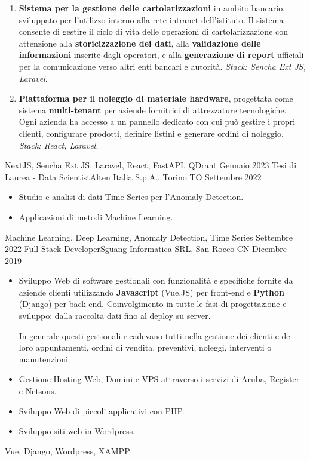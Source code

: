 \begin{experiences}
{\begin{itemize}
\begin{enumerate}
\item \textbf{Sistema per la gestione delle cartolarizzazioni} in ambito bancario, sviluppato per l’utilizzo interno alla rete intranet dell’istituto. Il sistema consente di gestire il ciclo di vita delle operazioni di cartolarizzazione con attenzione alla \textbf{storicizzazione dei dati}, alla \textbf{validazione delle informazioni} inserite dagli operatori, e alla \textbf{generazione di report} ufficiali per la comunicazione verso altri enti bancari e autorità. \textit{Stack: Sencha Ext JS, Laravel}.

\item \textbf{Piattaforma per il noleggio di materiale hardware}, progettata come sistema \textbf{multi-tenant} per aziende fornitrici di attrezzature tecnologiche. Ogni azienda ha accesso a un pannello dedicato con cui può gestire i propri clienti, configurare prodotti, definire listini e generare ordini di noleggio. \textit{Stack: React, Laravel}.

		\end{enumerate}
	\end{itemize}
        }
	{NextJS, Sencha Ext JS, Laravel, React, FastAPI, QDrant}
	\emptySeparator
	\emptySeparator
	\experience
	{Gennaio 2023}   {Tesi di Laurea - Data Scientist}{Alten Italia S.p.A., Torino TO}
	{Settembre 2022} {
		\begin{itemize}
			\item Studio e analisi di dati Time Series per l'Anomaly Detection.
			\item Applicazioni di metodi Machine Learning.
		\end{itemize}
	}
	{Machine Learning, Deep Learning, Anomaly Detection, Time Series}
	\emptySeparator
	\emptySeparator
	\experience
	{Settembre 2022}   {Full Stack Developer}{Sguang Informatica SRL, San Rocco CN}
	{Dicembre 2019} {
		\begin{itemize}
			\item Sviluppo Web di software gestionali con funzionalità e specifiche fornite da aziende clienti utilizzando \textbf{Javascript} (Vue.JS) per front-end e \textbf{Python} (Django) per back-end. Coinvolgimento in tutte le fasi di progettazione e sviluppo: dalla raccolta dati fino al deploy su server. 
            
            In generale questi gestionali ricadevano tutti nella gestione dei clienti e dei loro appuntamenti, ordini di vendita, preventivi, noleggi, interventi o manutenzioni.
			\item Gestione Hosting Web, Domini e VPS attraverso i servizi di Aruba, Register e Netsons.
			\item Sviluppo Web di piccoli applicativi con PHP.
			\item Sviluppo siti web in Wordpress.                         
		\end{itemize}
	}
	{Vue, Django, Wordpress, XAMPP}
	
	 
	
\end{experiences}
